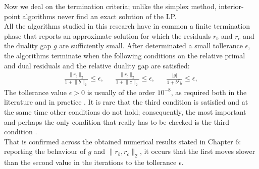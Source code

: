 \documentclass[a4paper,10 pt,titlepage,twoside]{book}
\theoremstyle{plain}
\theoremstyle{definition}
\theoremstyle{remark}
\begin{document}
{{\newpage
Now we deal on the termination criteria; unlike the simplex method, interior-point algorithms never find an exact solution of the LP.\\ All the algorithms studied in this research have in common a finite termination phase that reports an approximate solution for which the residuals $r_{b}$ and $r_{c}$ and the duality gap $g$ are sufficiently small. After determinated a small tollerance $\epsilon$, the algorithms terminate when the following conditions on the relative primal and dual residuals and the relative duality gap are satisfied:
\begin{align}\label{TermC}
\frac{\lVert r_{b}\rVert_{2}}{1+ \lVert b \rVert_{2}}\leq \epsilon, && \frac{\lVert r_{c}\rVert_{2}}{1 + \lVert c \rVert_{2}}\leq \epsilon, &&\frac{|g|}{1+b^{T}y}\leq \epsilon,
\end{align}
The tollerance value $\epsilon > 0$ is usually of the order $10^{-8}$, as required both in the literature and in practice \cite{Wright}. It is rare that the third condition is satisfied and at the same time
other conditions do not hold; consequently, the most important and perhaps
the only condition that really has to be checked is the third condition \cite{ADL}.\\
That is confirmed across the obtained numerical results stated in Chapter 6: reporting the behaviour of $g$ and $\lVert r_{b},r_{c}\rVert_{2}$, it occurs that the first moves slower than the second value in the iterations to the tollerance $\epsilon$.\\
}}
\end{document}
